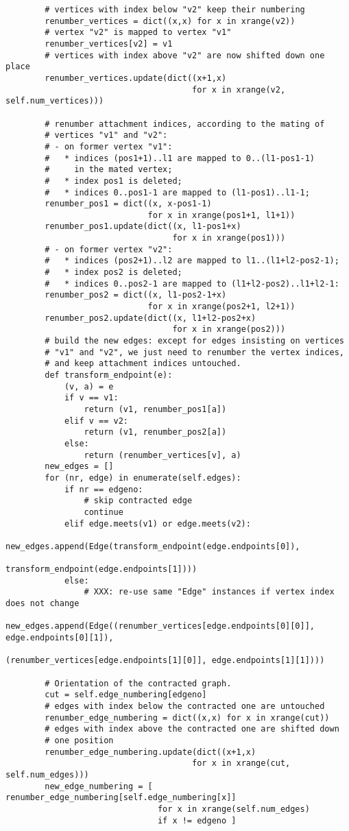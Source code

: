\begin{lstlisting}
        # vertices with index below "v2" keep their numbering
        renumber_vertices = dict((x,x) for x in xrange(v2))
        # vertex "v2" is mapped to vertex "v1"
        renumber_vertices[v2] = v1
        # vertices with index above "v2" are now shifted down one place
        renumber_vertices.update(dict((x+1,x)
                                      for x in xrange(v2, self.num_vertices)))
        
        # renumber attachment indices, according to the mating of
        # vertices "v1" and "v2":
        # - on former vertex "v1":
        #   * indices (pos1+1)..l1 are mapped to 0..(l1-pos1-1)
        #     in the mated vertex;
        #   * index pos1 is deleted;
        #   * indices 0..pos1-1 are mapped to (l1-pos1)..l1-1;
        renumber_pos1 = dict((x, x-pos1-1)
                             for x in xrange(pos1+1, l1+1))
        renumber_pos1.update(dict((x, l1-pos1+x)
                                  for x in xrange(pos1)))
        # - on former vertex "v2":
        #   * indices (pos2+1)..l2 are mapped to l1..(l1+l2-pos2-1);
        #   * index pos2 is deleted;
        #   * indices 0..pos2-1 are mapped to (l1+l2-pos2)..l1+l2-1:
        renumber_pos2 = dict((x, l1-pos2-1+x)
                             for x in xrange(pos2+1, l2+1))
        renumber_pos2.update(dict((x, l1+l2-pos2+x)
                                  for x in xrange(pos2)))
        # build the new edges: except for edges insisting on vertices
        # "v1" and "v2", we just need to renumber the vertex indices,
        # and keep attachment indices untouched.
        def transform_endpoint(e):
            (v, a) = e
            if v == v1:
                return (v1, renumber_pos1[a])
            elif v == v2:
                return (v1, renumber_pos2[a])
            else:
                return (renumber_vertices[v], a)
        new_edges = []
        for (nr, edge) in enumerate(self.edges):
            if nr == edgeno:
                # skip contracted edge
                continue
            elif edge.meets(v1) or edge.meets(v2):
                new_edges.append(Edge(transform_endpoint(edge.endpoints[0]),
                                      transform_endpoint(edge.endpoints[1])))
            else:
                # XXX: re-use same "Edge" instances if vertex index does not change
                new_edges.append(Edge((renumber_vertices[edge.endpoints[0][0]], edge.endpoints[0][1]),
                                      (renumber_vertices[edge.endpoints[1][0]], edge.endpoints[1][1])))

        # Orientation of the contracted graph.
        cut = self.edge_numbering[edgeno]
        # edges with index below the contracted one are untouched
        renumber_edge_numbering = dict((x,x) for x in xrange(cut))
        # edges with index above the contracted one are shifted down
        # one position
        renumber_edge_numbering.update(dict((x+1,x)
                                      for x in xrange(cut, self.num_edges)))
        new_edge_numbering = [ renumber_edge_numbering[self.edge_numbering[x]]
                               for x in xrange(self.num_edges)
                               if x != edgeno ]
        

\end{lstlisting}
